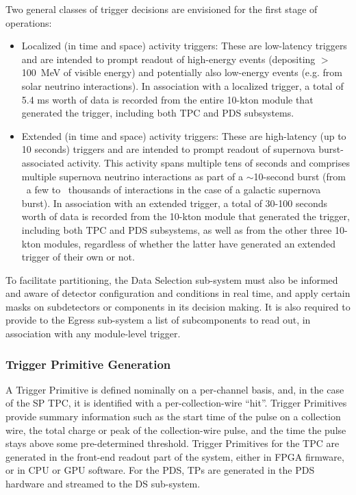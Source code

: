 Two general classes of trigger decisions are envisioned for the first
stage of operations:
\begin{itemize}
 \item Localized (in time and space) activity triggers: These are
   low-latency triggers and are intended to prompt readout of
   high-energy events (depositing $\gt$100~MeV of visible energy) 
   and potentially also low-energy events
   (e.g. from solar neutrino interactions). In association with a
   localized trigger, a total of 5.4 ms worth of data is recorded from
   the entire 10-kton module that generated the trigger, including
   both TPC and PDS subsystems.   
\item Extended (in time and space) activity triggers: These are
  high-latency (up to 10 seconds) triggers and are intended to prompt readout of
  supernova burst-associated activity. This activity spans multiple
  tens of seconds and comprises multiple supernova neutrino
  interactions as part of a $\sim$10-second burst (from ~a few to
  ~thousands of interactions in the case of a galactic supernova
  burst). In association with an extended trigger, a total of 30-100
  seconds worth of data is recorded from the 10-kton module that
  generated the trigger, including both TPC and PDS subsystems, as
  well as from the other three 10-kton modules, regardless of whether
  the latter have generated an extended trigger of their own or not.  
\end{itemize}

To facilitate partitioning, the Data Selection sub-system must also be
informed and aware of detector configuration and conditions in real
time, and apply certain masks on subdetectors or components
in its decision making. It is also required to provide to the Egress sub-system a list of
subcomponents to read out, in association
with any module-level trigger.

\subsubsection{Trigger Primitive Generation}
\label{sec:sp-daq:design-trigger-primitives}

A Trigger Primitive is defined nominally on a per-channel basis, and,
in the case of the SP TPC, it is identified with a per-collection-wire
``hit''. Trigger Primitives provide summary information
such as the start time of the pulse on a collection wire, the total
charge or peak of the collection-wire pulse, and the time the pulse
stays above some pre-determined threshold. Trigger Primitives for the
TPC are generated in the front-end readout part of the  
system, either in FPGA firmware, or in CPU or GPU software. For the
PDS, TPs are generated in the PDS hardware and streamed to the 
DS sub-system.


